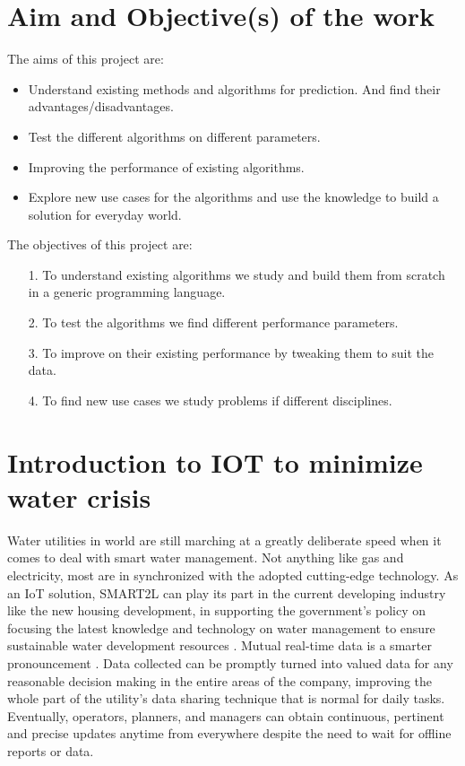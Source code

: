 \documentclass[12pt,times,a4paper]{report}
\begin{document}
{{\begin{normalsize}
\section{Aim and Objective(s) of the work}
The aims of this project are:
\begin{itemize}
    \item Understand existing methods and algorithms for prediction. And find their advantages/disadvantages.
    \item Test the different  algorithms on different parameters. 
    \item Improving the performance of existing algorithms.
    \item Explore new use cases for the algorithms and use the knowledge to build a solution for everyday world.
\end{itemize}
The objectives of this project are:
\begin{itemize}
    \item[1.]To understand existing algorithms we study and build them from scratch in a generic programming language.
    \item[2.]To test the algorithms we find different performance parameters.
    \item[3.]To improve on their existing performance by tweaking them to suit the data.
    \item[4.]To find new use cases we study problems if different disciplines.
\end{itemize}
\newpage
\section{Introduction to IOT to minimize water crisis }
Water utilities in world are still marching at a greatly deliberate speed when it comes to deal with smart water management. Not anything like gas and electricity, most are in synchronized with the adopted cutting-edge technology. As an IoT solution, SMART2L can play its part in the current developing industry like the new housing development, in supporting the government’s policy on focusing the latest knowledge and technology on water management to ensure sustainable water development resources .  
Mutual real-time data is a smarter pronouncement . Data collected can be promptly turned into valued data for any reasonable decision making in the entire areas of the company, improving the whole part of the utility's data sharing technique that is normal for daily tasks. Eventually, operators, planners, and managers can obtain continuous, pertinent and precise updates anytime from everywhere despite the need to wait for offline reports or data. 

\end{normalsize}}}
\end{document}
